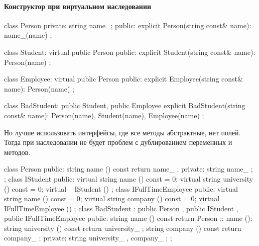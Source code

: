 \paragraph{Конструктор при виртуальном наследовании}
\begin{cppcode}
    class Person {
	private:
	string name_;
	public:
	explicit Person(string const& name): name_(name) {}
    };

    class Student: virtual public Person {
	public:
	explicit Student(string const& name): Person(name) {}
    };

    class Employee: virtual public Person {
	public:
	explicit Employee(string const& name): Person(name) {}
    };

    class BadStudent: public Student, public Employee {
	explicit BadStudent(string const& name): Person(name), Student(name), Employee(name) {}
    };
\end{cppcode}
Но лучше использовать интерфейсы, где все методы абстрактные, нет полей. Тогда при наследовании не будет проблем с дублированием переменных и методов.
\begin{cppcode}
class Person {
public:
    string name () const { return name_ ; }
private:
    string name_ ;
};
class IStudent {
public:
    virtual string name () const = 0;
    virtual string university () const = 0;
    virtual ~ IStudent () {}
};
class IFullTimeEmployee {
public:
    virtual string name () const = 0;
    virtual string company () const = 0;
    virtual ~ IFullTimeEmployee () {}
};
class BadStudent : public Person , public IStudent , public IFullTimeEmployee {
public:
    string name () const { return Person :: name (); }
    string university () const { return university_ ; }
    string company () const { return company_ ; }
private:
    string university_ , company_ ;
};
\end{cppcode}
